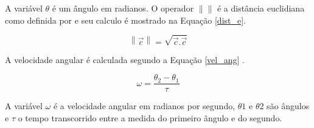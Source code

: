A variável $\theta$ é um ângulo em radianos.
O operador  $\left \| \right \|$ é a distância euclidiana como definida por  e seu calculo é mostrado na Equação \ref{dist_e}.

\begin{equation}
	\label{dist_e}
	  \left \| \overrightarrow{c} \right \|  =  \sqrt{\overrightarrow{c} . \overrightarrow{c}}
\end{equation}

A velocidade angular é calculada segundo a Equação \ref{vel_ang} .


\begin{equation}
	\label{vel_ang}
	\omega =  \frac{\theta_2 - \theta_1}{\tau}
\end{equation}

A variável $\omega$ é a velocidade angular em radianos por segundo, $\theta1$ e $\theta2$ são ângulos e $\tau$ o tempo transcorrido entre a medida do primeiro ângulo e do segundo.

